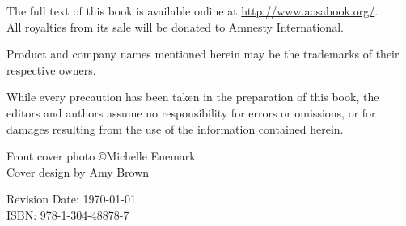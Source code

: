 \vspace{0.15cm}

\noindent
The full text of this book is available online at \url{http://www.aosabook.org/}.\\
All royalties from its sale will be donated to Amnesty International.\\

\vfill

\noindent Product and company names mentioned herein may be the trademarks of
their respective owners.\\

\vspace{0.15cm}

\noindent While every precaution has been taken in the preparation of this
book, the editors and authors assume no responsibility for errors or omissions,
or for damages resulting from the use of the information contained herein.\\

\vspace{0.15cm}

\noindent Front cover photo \copyright Michelle Enemark \\
\noindent Cover design by Amy Brown

\vspace{1cm}

\noindent Revision Date: \today \\

\noindent ISBN: 978-1-304-48878-7
\normalsize

\newpage






